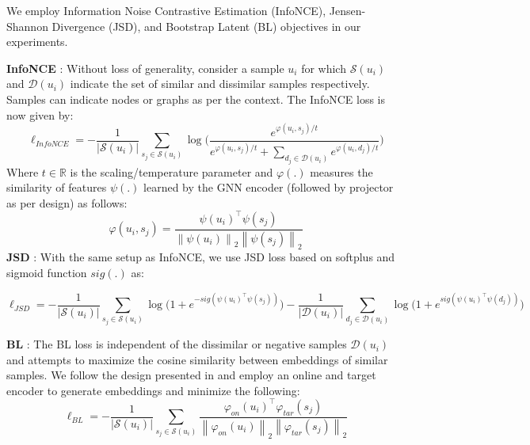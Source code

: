 \documentclass{article}
\newcommand{\norm}[1]{\left\lVert#1\right\rVert}
\def\sR{{\mathbb{R}}}
\theoremstyle{plain}
\theoremstyle{definition}
\theoremstyle{remark}
\begin{document}
We employ Information Noise Contrastive Estimation (InfoNCE), Jensen-Shannon Divergence (JSD), and Bootstrap Latent (BL) objectives in our experiments.

\textbf{InfoNCE} \citep{oord2018representation}: Without loss of generality, consider a sample $u_i$ for which $\mathcal{S}(u_i)$ and $\mathcal{D}(u_i)$ indicate the set of similar and dissimilar samples respectively. Samples can indicate nodes or graphs as per the context. The InfoNCE loss is now given by:
\begin{equation}
    \ell_{\textit{InfoNCE}} = -\frac{1}{|\mathcal{S}(u_i)|} \sum\limits_{s_j \in \mathcal{S}(u_i)} \log \Bigg(\frac{e^{\varphi(u_i, s_j)/t}}{e^{\varphi(u_i, s_j)/t} + \sum\limits_{d_j \in \mathcal{D}(u_i)}e^{\varphi(u_i, d_j)/t}} \Bigg)
\end{equation}
Where $t \in \sR$ is the scaling/temperature parameter and $\varphi(.)$ measures the similarity of features $\psi(.)$ learned by the GNN encoder (followed by projector as per design) as follows:
\begin{equation}
    \varphi(u_i, s_j) = \frac{\psi(u_i)^{\top}\psi(s_j)}{\norm{\psi(u_i)}_2\norm{\psi(s_j)}_2}
\end{equation}
\textbf{JSD} \citep{lin1991divergence}: With the same setup as InfoNCE, we use JSD loss based on softplus and sigmoid function $sig(.)$ as:

\begin{equation}
    \ell_{\textit{JSD}} = -\frac{1}{|\mathcal{S}(u_i)|} \sum\limits_{s_j \in \mathcal{S}(u_i)} \log \big( 1 + e^{-sig(\psi(u_i)^{\top}\psi(s_j))} \big)  - \frac{1}{|\mathcal{D}(u_i)|} \sum\limits_{d_j \in \mathcal{D}(u_i)} \log \big( 1 + e^{sig(\psi(u_i)^{\top}\psi(d_j))} \big) 
\end{equation}

\textbf{BL} \citep{thakoor2021bootstrapped}: The BL loss is independent of the dissimilar or negative samples $\mathcal{D}(u_i)$ and attempts to maximize the cosine similarity between embeddings of similar samples. We follow the design presented in \citet{thakoor2021bootstrapped} and employ an online and target encoder to generate embeddings and minimize the following:
\begin{equation}
    \ell_{\textit{BL}} = -\frac{1}{|\mathcal{S}(u_i)|} \sum\limits_{s_j \in \mathcal{S}(u_i)} \frac{\varphi_{\textit{on}}(u_i)^{\top}\varphi_{\textit{tar}}(s_j) }{\norm{\varphi_{\textit{on}}(u_i)}_2\norm{\varphi_{\textit{tar}}(s_j)}_2 }
\end{equation}
\end{document}
